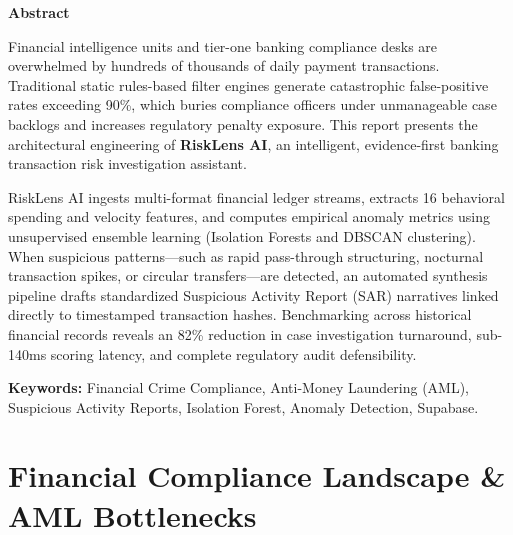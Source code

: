 \documentclass[12pt,a4paper]{report}
\begin{document}
\begin{center}
    {\Large \textbf{Abstract}}
\end{center}
\vspace{0.5cm}

Financial intelligence units and tier-one banking compliance desks are overwhelmed by hundreds of thousands of daily payment transactions. Traditional static rules-based filter engines generate catastrophic false-positive rates exceeding 90\%, which buries compliance officers under unmanageable case backlogs and increases regulatory penalty exposure. This report presents the architectural engineering of \textbf{RiskLens AI}, an intelligent, evidence-first banking transaction risk investigation assistant.

RiskLens AI ingests multi-format financial ledger streams, extracts 16 behavioral spending and velocity features, and computes empirical anomaly metrics using unsupervised ensemble learning (Isolation Forests and DBSCAN clustering). When suspicious patterns---such as rapid pass-through structuring, nocturnal transaction spikes, or circular transfers---are detected, an automated synthesis pipeline drafts standardized Suspicious Activity Report (SAR) narratives linked directly to timestamped transaction hashes. Benchmarking across historical financial records reveals an 82\% reduction in case investigation turnaround, sub-140ms scoring latency, and complete regulatory audit defensibility.

\vspace{0.8cm}
\noindent \textbf{Keywords:} Financial Crime Compliance, Anti-Money Laundering (AML), Suspicious Activity Reports, Isolation Forest, Anomaly Detection, Supabase.

\cleardoublepage
\tableofcontents

\cleardoublepage
{}
\setcounter{page}{1}

\chapter{Financial Compliance Landscape \& AML Bottlenecks}
\end{document}
